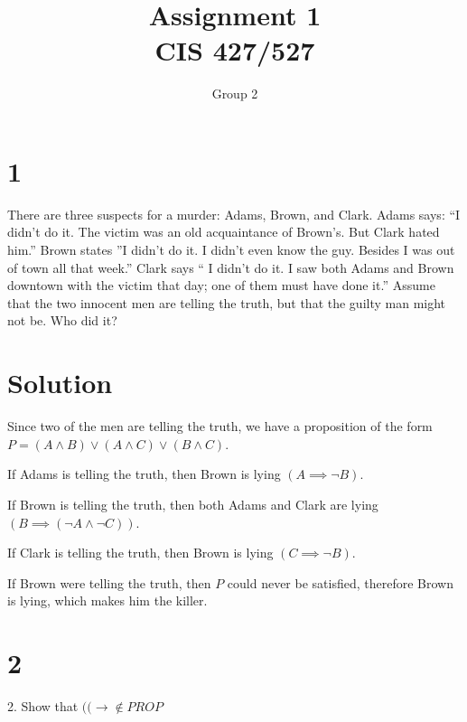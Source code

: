 \documentclass[10pt]{article}
\begin{document}
\title{Assignment \raisebox{.22ex}{\large\#}1 \\
	CIS 427/527}
\author{Group 2}

\maketitle


\section*{1}
There are three suspects for a murder: Adams, Brown, and Clark. Adams says: “I didn’t do it. The victim was an old acquaintance of Brown’s. But Clark hated him.” Brown states ”I didn’t do it. I didn’t even know the guy. Besides I was out of town all that week.” Clark says “ I didn’t do it. I saw both Adams and Brown downtown with the victim that day; one of them must have done it.” Assume that the two innocent men are telling the truth, but that the guilty man might not be. Who did it?

\section*{Solution}
Since two of the men are telling the truth, we have a proposition of the form $P = (A \land B) \lor (A \land C) \lor (B \land C)$. 
\begin{itemize*}
\item If Adams is telling the truth, then Brown is lying $(A\implies \lnot B)$.
\item If Brown is telling the truth, then both Adams and Clark are lying $(B\implies (\lnot A \land \lnot C))$.
\item If Clark is telling the truth, then Brown is lying $(C\implies \lnot B)$.
\end{itemize*}

\noindent If Brown were telling the truth, then $P$ could never be satisfied, therefore Brown is lying, which makes him the killer.


\section*{2}
\begin{description*}
	\item[2.] Show that $(( \to \notin PROP$
\end{description*}
\end{document}
